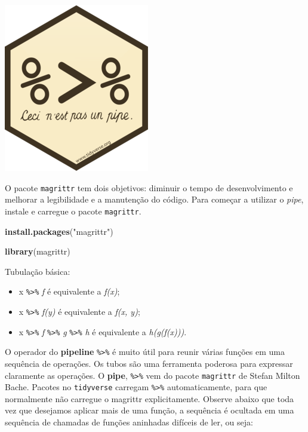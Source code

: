 \documentclass[]{book}
\newenvironment{Shaded}{\begin{snugshade}}{\end{snugshade}}
\newcommand{\KeywordTok}[1]{\textcolor[rgb]{0.13,0.29,0.53}{\textbf{#1}}}
\newcommand{\NormalTok}[1]{#1}
\newcommand{\StringTok}[1]{\textcolor[rgb]{0.31,0.60,0.02}{#1}}
\providecommand{\tightlist}{%
  \setlength{\itemsep}{0pt}\setlength{\parskip}{0pt}}
\begin{document}
\begin{center}\includegraphics[width=0.25\linewidth]{imagens/magritt} \end{center}

O pacote \texttt{magrittr} tem dois objetivos: diminuir o tempo de desenvolvimento e melhorar a legibilidade e a manutenção do código. Para começar a utilizar o \emph{pipe}, instale e carregue o pacote \texttt{magrittr}.

\begin{Shaded}
\begin{Highlighting}[]
\KeywordTok{install.packages}\NormalTok{(}\StringTok{"magrittr"}\NormalTok{)}
\end{Highlighting}
\end{Shaded}

\begin{Shaded}
\begin{Highlighting}[]
\KeywordTok{library}\NormalTok{(magrittr)}
\end{Highlighting}
\end{Shaded}

Tubulação básica:

\begin{itemize}
\tightlist
\item
  x \texttt{\%\textgreater{}\%} \emph{f} é equivalente a \emph{f(x)};
\item
  x \texttt{\%\textgreater{}\%} \emph{f(y)} é equivalente a \emph{f(x, y)};
\item
  x \texttt{\%\textgreater{}\%} \emph{f} \texttt{\%\textgreater{}\%} \emph{g} \texttt{\%\textgreater{}\%} \emph{h} é equivalente a \emph{h(g(f(x)))}.
\end{itemize}

O operador do \textbf{pipeline} \texttt{\%\textgreater{}\%} é muito útil para reunir várias funções em uma sequência de operações. Os tubos são uma ferramenta poderosa para expressar claramente as operações. O \textbf{pipe}, \texttt{\%\textgreater{}\%} vem do pacote \texttt{magrittr} de Stefan Milton Bache. Pacotes no \texttt{tidyverse} carregam \texttt{\%\textgreater{}\%} automaticamente, para que normalmente não carregue o magrittr explicitamente. Observe abaixo que toda vez que desejamos aplicar mais de uma função, a sequência é ocultada em uma sequência de chamadas de funções aninhadas difíceis de ler, ou seja:
\end{document}
